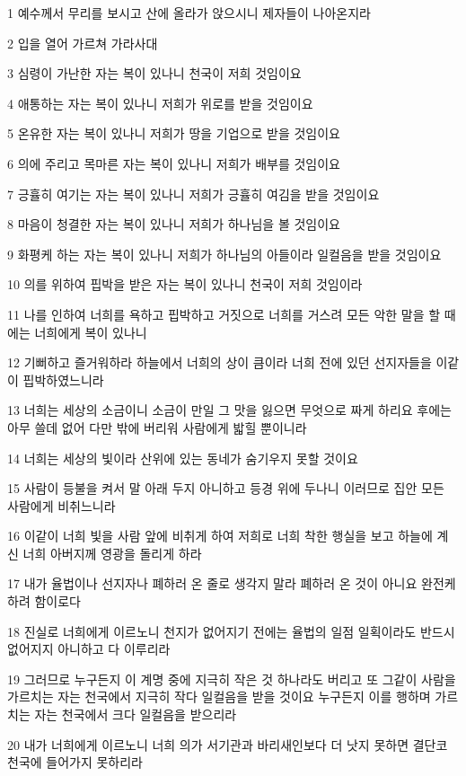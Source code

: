 \par 1 예수께서 무리를 보시고 산에 올라가 앉으시니 제자들이 나아온지라
\par 2 입을 열어 가르쳐 가라사대
\par 3 심령이 가난한 자는 복이 있나니 천국이 저희 것임이요
\par 4 애통하는 자는 복이 있나니 저희가 위로를 받을 것임이요
\par 5 온유한 자는 복이 있나니 저희가 땅을 기업으로 받을 것임이요
\par 6 의에 주리고 목마른 자는 복이 있나니 저희가 배부를 것임이요
\par 7 긍휼히 여기는 자는 복이 있나니 저희가 긍휼히 여김을 받을 것임이요
\par 8 마음이 청결한 자는 복이 있나니 저희가 하나님을 볼 것임이요
\par 9 화평케 하는 자는 복이 있나니 저희가 하나님의 아들이라 일컬음을 받을 것임이요
\par 10 의를 위하여 핍박을 받은 자는 복이 있나니 천국이 저희 것임이라
\par 11 나를 인하여 너희를 욕하고 핍박하고 거짓으로 너희를 거스려 모든 악한 말을 할 때에는 너희에게 복이 있나니
\par 12 기뻐하고 즐거워하라 하늘에서 너희의 상이 큼이라 너희 전에 있던 선지자들을 이같이 핍박하였느니라
\par 13 너희는 세상의 소금이니 소금이 만일 그 맛을 잃으면 무엇으로 짜게 하리요 후에는 아무 쓸데 없어 다만 밖에 버리워 사람에게 밟힐 뿐이니라
\par 14 너희는 세상의 빛이라 산위에 있는 동네가 숨기우지 못할 것이요
\par 15 사람이 등불을 켜서 말 아래 두지 아니하고 등경 위에 두나니 이러므로 집안 모든 사람에게 비취느니라
\par 16 이같이 너희 빛을 사람 앞에 비취게 하여 저희로 너희 착한 행실을 보고 하늘에 계신 너희 아버지께 영광을 돌리게 하라
\par 17 내가 율법이나 선지자나 폐하러 온 줄로 생각지 말라 폐하러 온 것이 아니요 완전케 하려 함이로다
\par 18 진실로 너희에게 이르노니 천지가 없어지기 전에는 율법의 일점 일획이라도 반드시 없어지지 아니하고 다 이루리라
\par 19 그러므로 누구든지 이 계명 중에 지극히 작은 것 하나라도 버리고 또 그같이 사람을 가르치는 자는 천국에서 지극히 작다 일컬음을 받을 것이요 누구든지 이를 행하며 가르치는 자는 천국에서 크다 일컬음을 받으리라
\par 20 내가 너희에게 이르노니 너희 의가 서기관과 바리새인보다 더 낫지 못하면 결단코 천국에 들어가지 못하리라
